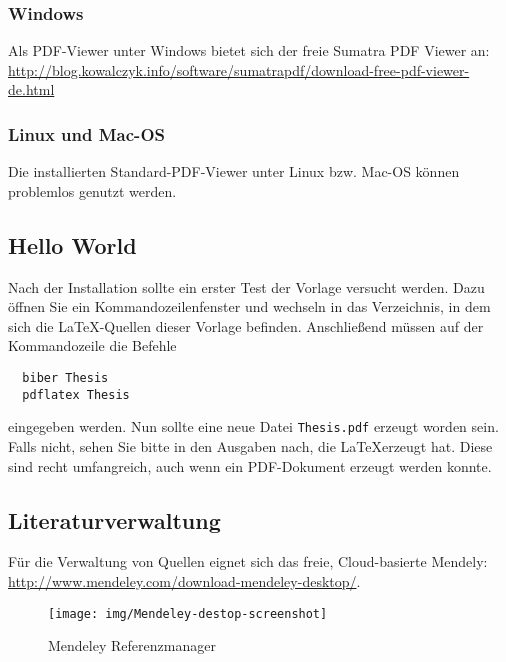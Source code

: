 \subsubsection{Windows}

Als PDF-Viewer unter Windows bietet sich der freie Sumatra PDF Viewer an: \url{http://blog.kowalczyk.info/software/sumatrapdf/download-free-pdf-viewer-de.html}

\subsubsection{Linux und Mac-OS}

Die installierten Standard-PDF-Viewer unter Linux bzw. Mac-OS können problemlos genutzt werden.

\subsection{Hello World}
Nach der Installation sollte ein erster Test der Vorlage versucht werden. Dazu öffnen Sie ein Kommandozeilenfenster und wechseln in das Verzeichnis, in dem sich die {\LaTeX}-Quellen dieser Vorlage befinden. Anschließend müssen auf der Kommandozeile die Befehle 
\begin{lstlisting}
  biber Thesis
  pdflatex Thesis
\end{lstlisting}
eingegeben werden. Nun sollte eine neue Datei \texttt{Thesis.pdf} erzeugt worden sein. Falls nicht, sehen Sie bitte in den Ausgaben nach, die \LaTeX erzeugt hat. Diese sind recht umfangreich, auch wenn ein PDF-Dokument erzeugt werden konnte.


\subsection{Literaturverwaltung}

Für die Verwaltung von Quellen eignet sich das freie, Cloud-basierte Mendely: \url{http://www.mendeley.com/download-mendeley-desktop/}. 

\begin{figure}[hbt]
\centering
\begin{minipage}[t]{1\textwidth} %
\caption{Mendeley Referenzmanager} %
\texttt{[image: img/Mendeley-destop-screenshot]}\\ %
\end{minipage}
\end{figure}

